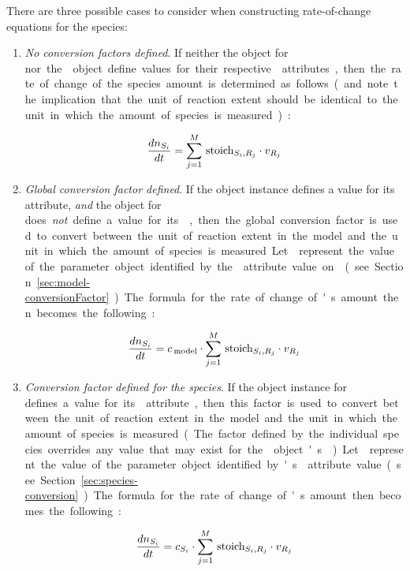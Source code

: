 There are three possible cases to consider when constructing
rate-of-change equations for the species:
\begin{enumerate}\setlength{\parskip}{-0.2ex}

\item \emph{No conversion factors defined}.  If neither the
  \Species object for \si nor the \Model object define values for
  their respective  attributes, then the
  rate of change of the species amount is determined as follows
  (and note the implication that the unit of reaction extent should
  be identical to the unit in which the amount of species \si is
  measured):
  \begin{linenomath}
    \begin{equation*}
      \frac{d n_{S_i}}{dt} = \sum_{j=1}^{M} \, \textrm{stoich}_{S_{i},R_{j}} \cdot v_{R_j} 
    \end{equation*}
  \end{linenomath}

\item \emph{Global conversion factor defined}.  If the \Model
  object instance defines a value for its 
  attribute, \emph{and} the \Species object for \si does
  \emph{not} define a value for its , then
  the global conversion factor is used to convert between the unit
  of reaction extent in the model and the unit in which the amount
  of species \si is measured.  Let \csg represent the value of the
  parameter object identified by the 
  attribute value on \Model (see
  Section~\ref{sec:model-conversionFactor}).  The formula for the
  rate of change of \si's amount then becomes the following:
  \begin{linenomath}
    \begin{equation*}
      \frac{d n_{S_i}}{dt} = c_{\,\textrm{model}} \cdot \sum_{j=1}^{M} \, \textrm{stoich}_{S_{i},R_{j}} \cdot v_{R_j} 
    \end{equation*}
  \end{linenomath}

\item \emph{Conversion factor defined for the species}.  If the
  \Species object instance for \si defines a value for its
   attribute, then this factor is used to
  convert between the unit of reaction extent in the model and the
  unit in which the amount of species \si is measured.  (The
  factor defined by the individual species overrides any value
  that may exist for the \Model object's
  .)  Let \csi represent the value of the
  parameter object identified by \si's 
  attribute value (see Section~\ref{sec:species-conversion}).  The
  formula for the rate of change of \si's amount then becomes the
  following:
  \begin{linenomath}
    \begin{equation*}
      \frac{d n_{S_i}}{dt} = c_{S_i} \cdot \sum_{j=1}^{M} \, \textrm{stoich}_{S_{i},R_{j}} \cdot v_{R_j} 
    \end{equation*}
  \end{linenomath}

\end{enumerate}
\vspace*{-1ex}

